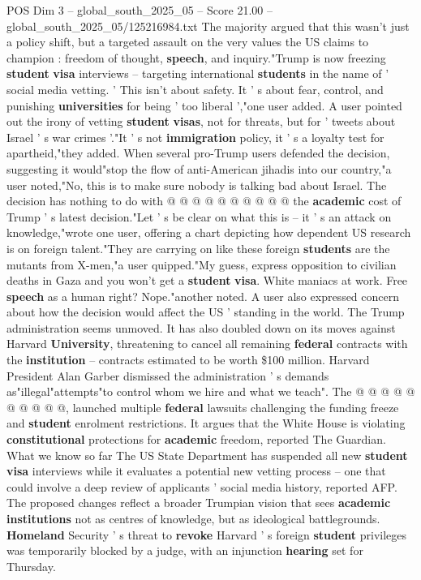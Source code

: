 \begin{textsample}{POS Dim 3 – global\_south\_2025\_05 – Score 21.00 – global\_south\_2025\_05/125216984.txt}
The majority argued that this wasn't just a policy shift, but a targeted assault on the very values the US claims to champion : freedom of thought, \textbf{speech}, and inquiry."Trump is now freezing \textbf{student} \textbf{visa} interviews -- targeting international \textbf{students} in the name of ' social media vetting. ' This isn't about safety.
It ' s about fear, control, and punishing \textbf{universities} for being ' too liberal ',"one user added.
A user pointed out the irony of vetting \textbf{student} \textbf{visas}, not for threats, but for ' tweets about Israel ' s war crimes '."It ' s not \textbf{immigration} policy, it ' s a loyalty test for apartheid,"they added.
When several pro-Trump users defended the decision, suggesting it would"stop the flow of anti-American jihadis into our country,"a user noted,"No, this is to make sure nobody is talking bad about Israel.
The decision has nothing to do with @ @ @ @ @ @ @ @ @ @ the \textbf{academic} cost of Trump ' s latest decision."Let ' s be clear on what this is -- it ' s an attack on knowledge,"wrote one user, offering a chart depicting how dependent US research is on foreign talent."They are carrying on like these foreign \textbf{students} are the mutants from X-men,"a user quipped."My guess, express opposition to civilian deaths in Gaza and you won't get a \textbf{student} \textbf{visa}.
White maniacs at work.
Free \textbf{speech} as a human right?
Nope."another noted.
A user also expressed concern about how the decision would affect the US ' standing in the world.
The Trump administration seems unmoved.
It has also doubled down on its moves against Harvard \textbf{University}, threatening to cancel all remaining \textbf{federal} contracts with the \textbf{institution} -- contracts estimated to be worth \$100 million.
Harvard President Alan Garber dismissed the administration ' s demands as"illegal"attempts"to control whom we hire and what we teach".
The @ @ @ @ @ @ @ @ @ @, launched multiple \textbf{federal} lawsuits challenging the funding freeze and \textbf{student} enrolment restrictions.
It argues that the White House is violating \textbf{constitutional} protections for \textbf{academic} freedom, reported The Guardian.
What we know so far The US State Department has suspended all new \textbf{student} \textbf{visa} interviews while it evaluates a potential new vetting process -- one that could involve a deep review of applicants ' social media history, reported AFP.
The proposed changes reflect a broader Trumpian vision that sees \textbf{academic} \textbf{institutions} not as centres of knowledge, but as ideological battlegrounds. \textbf{Homeland} Security ' s threat to \textbf{revoke} Harvard ' s foreign \textbf{student} privileges was temporarily blocked by a judge, with an injunction \textbf{hearing} set for Thursday.

\end{textsample}
